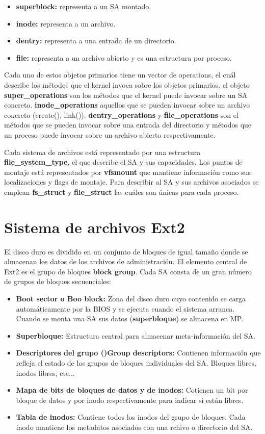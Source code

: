 \begin{itemize}
	\item\textbf{superblock:} representa a un SA montado.
	\item\textbf{inode:} representa a un archivo.
	\item\textbf{dentry:} representa a una entrada de un directorio.
	\item\textbf{file:} representa a un archivo abierto y es una estructura por proceso.
\end{itemize}

Cada uno de estos objetos primarios tiene un vector de operations, el cuál describe los métodos que el kernel invoca sobre los objetos primarios. el objeto \textbf{super_operations} son los métodos que el kernel puede invocar sobre un SA concreto. \textbf{inode_operations} aquellos que se pueden invocar sobre un archivo concreto (create(), link()). \textbf{dentry_operations} y \textbf{file_operations} son el métodos que se pueden invocar sobre una entrada del directorio y métodos que un proceso puede invocar sobre un archivo abierto respectivamente.

Cada sistema de archivos está representado por una estructura \textbf{file_system_type}, el que describe el SA y sus capacidades. Los puntos de montaje está representados por \textbf{vfsmount} que mantiene información como sus localizaciones y flags de montaje. Para describir al SA y sus archivos asociados se emplean \textbf{fs_struct} y \textbf{file_struct} las cuáles son únicas para cada proceso.

\section*{Sistema de archivos Ext2}

El disco duro es dividido en un conjunto de bloques de igual tamaño donde se almacenan los datos de los archivos de administración. El elemento central de Ext2 es el grupo de bloques \textbf{block group}. Cada SA consta de un gran número de grupos de bloques secuenciales:

\begin{itemize}
	\item\textbf{Boot sector o Boo block:} Zona del disco duro cuyo contenido se carga automáticamente por la BIOS y se ejecuta cuando el sistema arranca. Cuando se monta una SA sus datos (\textbf{superbloque}) se almacena en MP.
	\item\textbf{Superbloque:} Estructura central para almacenar meta-información del SA.
	\item\textbf{Descriptores del grupo ()Group descriptors:} Contienen información que refleja el estado de los grupos de bloques individuales del SA. Bloques libres, inodos libres, etc...
	\item\textbf{Mapa de bits de bloques de datos y de inodos:} Cotienen un bit por bloque de datos y por inodo respectivamente para indicar si están libres.
	\item\textbf{Tabla de inodos:} Contiene todos los inodos del grupo de bloques. Cada inodo mantiene los metadatos asociados con una rchivo o directorio del SA.
\end{itemize}

